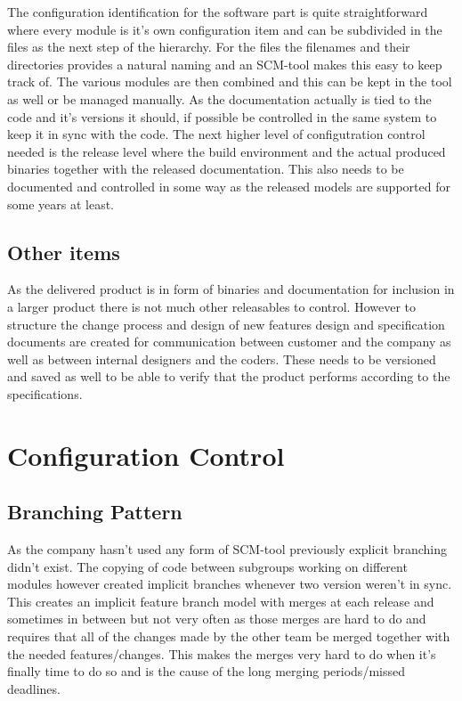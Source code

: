 \documentclass[a4paper,11pt]{article}
\begin{document}
The configuration identification for the software part is quite straightforward
 where every module is it's own configuration item and can be subdivided in the
files as the next step of the hierarchy. For the files the filenames and their
directories provides a natural naming and an SCM-tool makes this easy to keep
track of. The various modules are then combined and this can be kept in the tool
as well or be managed manually. As the documentation actually is tied to the
code and it's versions it should, if possible be controlled in the same system
to keep it in sync with the code. The next higher level of configutration
control needed is the release level where the build environment and the actual
produced binaries together with the released documentation. This also needs to
be documented and controlled in some way as the released models are supported
for some years at least.


\subsection{Other items}

As the delivered product is in form of binaries and documentation for inclusion
in a larger product there is not much other releasables to control. However to
structure the change process and design of new features design and specification
documents are created for communication between customer and the company as well
as between internal designers and the coders. These needs to be versioned and
saved as well to be able to verify that the product performs according to the
specifications.

\section{Configuration Control}


\subsection{Branching Pattern}

As the company hasn't used any form of SCM-tool previously explicit branching didn't exist.
The copying of code between subgroups working on different modules however
created implicit branches whenever two version weren't in sync. This creates an
implicit feature branch model with merges at each release and sometimes in
between but not very often as those merges are hard to do and requires that all
of the changes made by the other team be merged together with the needed
features/changes. This makes the merges very hard to do when it's finally time
to do so and is the cause of the long merging periods/missed deadlines.
\end{document}
